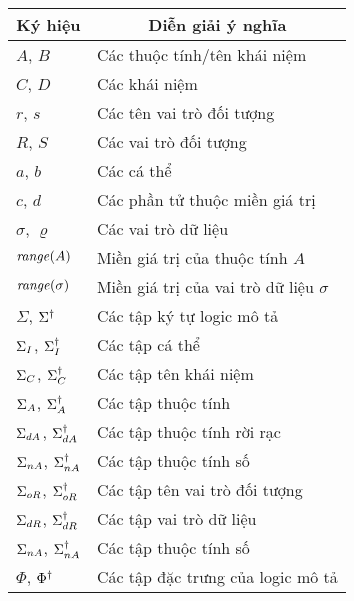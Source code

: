\begin{tabular}{| p{2.5cm} | p{10.0cm} |}
	\hline
	\multicolumn{1}{|c|}{\bf Ký hiệu} & \multicolumn{1}{c|}{\bf Diễn giải ý nghĩa}\\
	\hline
	$A$, $B$ & Các thuộc tính/tên khái niệm \\
	$C$, $D$ & Các khái niệm \\
	$r$, $s$ & Các tên vai trò đối tượng \\
	$R$, $S$ & Các vai trò đối tượng \\
	$a$, $b$ & Các cá thể \\
	$c$, $d$ & Các phần tử thuộc miền giá trị \\
	$\sigma$, $\varrho$ & Các vai trò dữ liệu \\
	$\mathit{range}(A)$ & Miền giá trị của thuộc tính $A$ \\
	$\mathit{range}(\sigma)$ & Miền giá trị của vai trò dữ liệu $\sigma$ \\
	$\Sigma$, $\Sigma^\dag$ & Các tập ký tự logic mô tả \\
	$\Sigma_I$, $\Sigma^\dag_I$ & Các tập cá thể \\
	$\Sigma_C$, $\Sigma^\dag_C$ & Các tập tên khái niệm \\
	$\Sigma_A$, $\Sigma^\dag_A$ & Các tập thuộc tính \\	
	$\Sigma_{dA}$, $\Sigma^\dag_{dA}$ & Các tập thuộc tính rời rạc \\
	$\Sigma_{nA}$, $\Sigma^\dag_{nA}$ & Các tập thuộc tính số\\
	$\Sigma_{oR}$, $\Sigma^\dag_{oR}$ & Các tập tên vai trò đối tượng\\
	$\Sigma_{dR}$, $\Sigma^\dag_{dR}$ & Các tập vai trò dữ liệu\\
	$\Sigma_{nA}$, $\Sigma^\dag_{nA}$ & Các tập thuộc tính số\\
	$\Phi$, $\Phi^\dag$ & Các tập đặc trưng của logic mô tả\\

\end{tabular}
